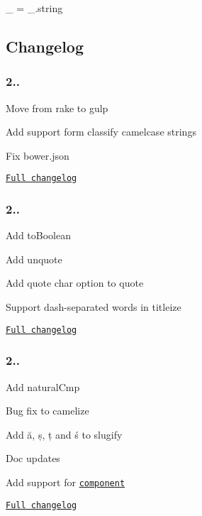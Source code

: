 \begin{DoxyCode}
\_ = \_.string
\end{DoxyCode}


\subsection*{Changelog}

\subsubsection*{2..}


\begin{DoxyItemize}
\item Move from rake to gulp
\item Add support form classify camelcase strings
\item Fix bower.\+json
\item \href{https://github.com/epeli/underscore.string/compare/v2.3.3...2.4.0}{\tt Full changelog}
\end{DoxyItemize}

\subsubsection*{2..}


\begin{DoxyItemize}
\item Add {\ttfamily to\+Boolean}
\item Add {\ttfamily unquote}
\item Add quote char option to {\ttfamily quote}
\item Support dash-\/separated words in {\ttfamily titleize}
\item \href{https://github.com/epeli/underscore.string/compare/v2.3.2...2.3.3}{\tt Full changelog}
\end{DoxyItemize}

\subsubsection*{2..}


\begin{DoxyItemize}
\item Add {\ttfamily natural\+Cmp}
\item Bug fix to {\ttfamily camelize}
\item Add ă, ș, ț and ś to {\ttfamily slugify}
\item Doc updates
\item Add support for \href{http://component.io/}{\tt component}
\item \href{https://github.com/epeli/underscore.string/compare/v2.3.1...v2.3.2}{\tt Full changelog}
\end{DoxyItemize}


